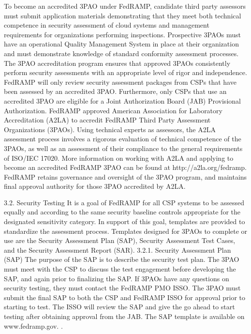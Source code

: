 \documentclass[../main.tex]{subfiles}
\begin{document}
To become an accredited 3PAO under FedRAMP, candidate third party assessors must submit application materials demonstrating that they meet both technical competence in security assessment of cloud systems and management requirements for organizations performing inspections. Prospective 3PAOs must have an operational Quality Management System in place at their organization and must demonstrate knowledge of standard conformity assessment processes.  
The 3PAO accreditation program ensures that approved 3PAOs consistently perform security assessments with an appropriate level of rigor and independence.  FedRAMP will only review security assessment packages from CSPs that have been assessed by an accredited 3PAO.  Furthermore, only CSPs that use an accredited 3PAO are eligible for a Joint Authorization Board (JAB) Provisional Authorization.
FedRAMP approved American Association for Laboratory Accreditation (A2LA) to accredit FedRAMP Third Party Assessment Organizations (3PAOs).  Using technical experts as assessors, the A2LA assessment process involves a rigorous evaluation of technical competence of the 3PAOs, as well as an assessment of their compliance to the general requirements of ISO/IEC 17020.  More information on working with A2LA and applying to become an accredited FedRAMP 3PAO can be found at http://a2la.org/fedramp.
FedRAMP retains governance and oversight of the 3PAO program, and maintains final approval authority for those 3PAO accredited by A2LA.


3.2. Security Testing
It is a goal of FedRAMP for all CSP systems to be assessed equally and according to the same security baseline controls appropriate for the designated sensitivity category.  In support of this goal, templates are provided to standardize the assessment process.  Templates designed for 3PAOs to complete or use are the Security Assessment Plan (SAP), Security Assessment Test Cases, and the Security Assessment Report (SAR).
3.2.1. Security Assessment Plan (SAP) 
The purpose of the SAP is to describe the security test plan.  The 3PAO must meet with the CSP to discuss the test engagement before developing the SAP, and again prior to finalizing the SAP.  If 3PAOs have any questions on security testing, they must contact the FedRAMP PMO ISSO.  The 3PAO must submit the final SAP to both the CSP and FedRAMP ISSO for approval prior to starting to test.  The ISSO will review the SAP and give the go ahead to start testing after obtaining approval from the JAB.  The SAP template is available on www.fedramp.gov. .  
\end{document}
